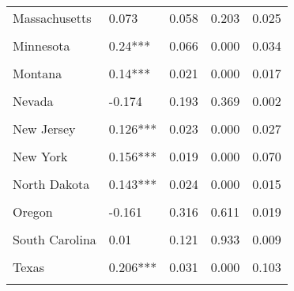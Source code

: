 \begin{table}[!h]
\begin{tabular}[t]{llrrr}
Massachusetts & 0.073 & 0.058 & 0.203 & 0.025\\
\cellcolor{gray!10}{Michigan} & \cellcolor{gray!10}{0.101***} & \cellcolor{gray!10}{0.033} & \cellcolor{gray!10}{0.003} & \cellcolor{gray!10}{0.057}\\
Minnesota & 0.24*** & 0.066 & 0.000 & 0.034\\
\cellcolor{gray!10}{Mississippi} & \cellcolor{gray!10}{0.246***} & \cellcolor{gray!10}{0.030} & \cellcolor{gray!10}{0.000} & \cellcolor{gray!10}{0.013}\\
Montana & 0.14*** & 0.021 & 0.000 & 0.017\\
\cellcolor{gray!10}{Nebraska} & \cellcolor{gray!10}{0.132***} & \cellcolor{gray!10}{0.012} & \cellcolor{gray!10}{0.000} & \cellcolor{gray!10}{0.025}\\
Nevada & -0.174 & 0.193 & 0.369 & 0.002\\
\cellcolor{gray!10}{New Hampshire} & \cellcolor{gray!10}{0.461**} & \cellcolor{gray!10}{0.200} & \cellcolor{gray!10}{0.021} & \cellcolor{gray!10}{0.007}\\
New Jersey & 0.126*** & 0.023 & 0.000 & 0.027\\
\cellcolor{gray!10}{New Mexico} & \cellcolor{gray!10}{-0.434} & \cellcolor{gray!10}{0.317} & \cellcolor{gray!10}{0.172} & \cellcolor{gray!10}{0.010}\\
New York & 0.156*** & 0.019 & 0.000 & 0.070\\
\cellcolor{gray!10}{North Carolina} & \cellcolor{gray!10}{0.137} & \cellcolor{gray!10}{0.087} & \cellcolor{gray!10}{0.115} & \cellcolor{gray!10}{0.012}\\
North Dakota & 0.143*** & 0.024 & 0.000 & 0.015\\
\cellcolor{gray!10}{Ohio} & \cellcolor{gray!10}{0.177***} & \cellcolor{gray!10}{0.029} & \cellcolor{gray!10}{0.000} & \cellcolor{gray!10}{0.067}\\
Oregon & -0.161 & 0.316 & 0.611 & 0.019\\
\cellcolor{gray!10}{Pennsylvania} & \cellcolor{gray!10}{0.147***} & \cellcolor{gray!10}{0.050} & \cellcolor{gray!10}{0.004} & \cellcolor{gray!10}{0.055}\\
South Carolina & 0.01 & 0.121 & 0.933 & 0.009\\
\cellcolor{gray!10}{South Dakota} & \cellcolor{gray!10}{0.156***} & \cellcolor{gray!10}{0.035} & \cellcolor{gray!10}{0.000} & \cellcolor{gray!10}{0.016}\\
Texas & 0.206*** & 0.031 & 0.000 & 0.103\\
\cellcolor{gray!10}{Utah} & \cellcolor{gray!10}{0.075} & \cellcolor{gray!10}{0.114} & \cellcolor{gray!10}{0.507} & \cellcolor{gray!10}{0.004}\\

\end{tabular}
\end{table}
